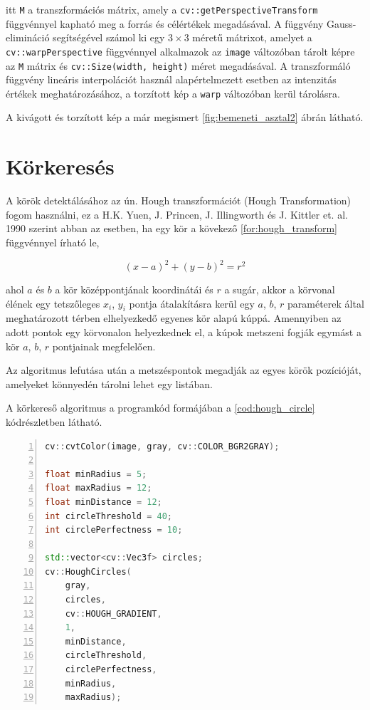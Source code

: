 \par itt \lstinline{M} a transzformációs mátrix, amely a \lstinline{cv::getPerspectiveTransform} függvénnyel \cite{opencv_docs} kapható meg a forrás és célértékek megadásával. A függvény Gauss-elimináció \cite{grcar2011mathematicians} segítségével számol ki egy $3\times3$ méretű mátrixot, amelyet a \lstinline{cv::warpPerspective} függvénnyel \cite{opencv_docs} alkalmazok az \lstinline{image} változóban tárolt képre az \lstinline{M} mátrix és \lstinline{cv::Size(width, height)} méret megadásával. A transzformáló függvény lineáris interpolációt \cite{blu0401interpolation} használ alapértelmezett esetben az intenzitás értékek meghatározásához, a torzított kép a \lstinline{warp} változóban kerül tárolásra.
\par A kivágott és torzított kép a már megismert \ref{fig:bemeneti_asztal2} ábrán látható.

\section{Körkeresés}
A körök detektálásához az ún. Hough transzformációt (Hough Transformation) fogom használni, ez a H.K. Yuen, J. Princen, J. Illingworth és J. Kittler et. al. 1990 \cite{YUEN199071} szerint abban az esetben, ha egy kör a kövekező \ref{for:hough_transform} függvénnyel írható le,

\begin{equation}
    (x - a)^2 + (y - b)^2 = r^2
    \label{for:hough_transform}
\end{equation}

\par ahol $a$ és $b$ a kör középpontjának koordinátái és $r$ a sugár, akkor a körvonal élének egy tetszőleges $x_i$, $y_i$ pontja átalakításra kerül egy $a$, $b$, $r$ paraméterek által meghatározott térben elhelyezkedő egyenes kör alapú kúppá.\cite{hough_transform,YUEN199071} Amennyiben az adott pontok egy körvonalon helyezkednek el, a kúpok metszeni fogják egymást a kör $a$, $b$, $r$ pontjainak megfelelően.\cite{YUEN199071}
\par Az algoritmus lefutása után a metszéspontok megadják az egyes körök pozícióját, amelyeket könnyedén tárolni lehet egy listában.
\par A körkereső algoritmus a programkód formájában a \ref{cod:hough_circle} kódrészletben látható.

\vspace{2mm}
\hspace{-10mm}
\begin{minipage}{\linewidth}
\begin{lstlisting}[language=C++, numbers=left, caption={A körkereső algoritmus.}, label={cod:hough_circle}]
cv::cvtColor(image, gray, cv::COLOR_BGR2GRAY);

float minRadius = 5;
float maxRadius = 12;
float minDistance = 12;
int circleThreshold = 40;
int circlePerfectness = 10;

std::vector<cv::Vec3f> circles;
cv::HoughCircles(
    gray,
    circles,
    cv::HOUGH_GRADIENT,
    1,
    minDistance,
    circleThreshold,
    circlePerfectness,
    minRadius,
    maxRadius);
\end{lstlisting}
\end{minipage}

